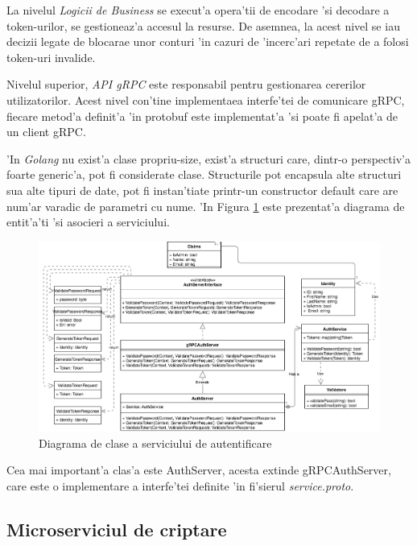 \documentclass[12pt,a4paper,twoside]{report}
\begin{document}
La nivelul \textit{Logicii de Business} se execut'a opera'tii de encodare 'si decodare a token-urilor, se gestioneaz'a accesul la resurse. De asemnea, la acest nivel se iau decizii legate de blocarae unor conturi 'in cazuri de 'incerc'ari repetate de a folosi token-uri invalide.

Nivelul superior, \textit{API gRPC} este responsabil pentru gestionarea cererilor utilizatorilor. Acest nivel con'tine implementaea interfe'tei de comunicare gRPC, fiecare metod'a definit'a 'in protobuf este implementat'a 'si poate fi apelat'a de un client gRPC.

'In \textit{Golang} nu exist'a clase propriu-size, exist'a structuri care, dintr-o perspectiv'a foarte generic'a, pot fi considerate clase. Structurile pot encapsula alte structuri sua alte tipuri de date, pot fi instan'tiate printr-un constructor default care are num'ar varadic de parametri cu nume. 'In Figura \ref{auth_classes} este prezentat'a diagrama de entit'a'ti 'si asocieri a serviciului.
\begin{figure}[H]
\begin{center}
\advance\leftskip-3cm
\advance\rightskip-3cm
\includegraphics[keepaspectratio=true,scale=0.5]{img/auth_classes.png}
\caption{Diagrama de clase a serviciului de autentificare}
\label{auth_classes}
\end{center}
\end{figure}

Cea mai important'a clas'a este AuthServer, acesta extinde gRPCAuthServer, care este o implementare a interfe'tei definite 'in fi'sierul \textit{service.proto}. 


\subsection{Microserviciul de criptare} \label{s_crypto}
\end{document}
